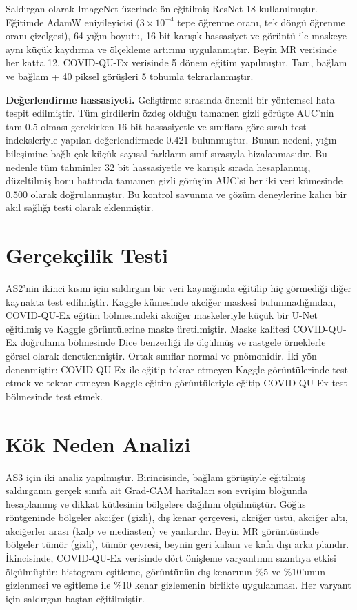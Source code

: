 Saldırgan olarak ImageNet \cite{deng2009imagenet} üzerinde ön eğitilmiş ResNet-18 \cite{he2016resnet} kullanılmıştır. Eğitimde AdamW eniyileyicisi \cite{loshchilov2019adamw} ($3 \times 10^{-4}$ tepe öğrenme oranı, tek döngü öğrenme oranı çizelgesi), 64 yığın boyutu, 16 bit karışık hassasiyet ve görüntü ile maskeye aynı küçük kaydırma ve ölçekleme artırımı uygulanmıştır. Beyin MR verisinde her katta 12, COVID-QU-Ex verisinde 5 dönem eğitim yapılmıştır. Tam, bağlam ve bağlam + 40 piksel görüşleri 5 tohumla tekrarlanmıştır.

\textbf{Değerlendirme hassasiyeti.} Geliştirme sırasında önemli bir yöntemsel hata tespit edilmiştir. Tüm girdilerin özdeş olduğu tamamen gizli görüşte AUC'nin tam $0.5$ olması gerekirken 16 bit hassasiyetle ve sınıflara göre sıralı test indeksleriyle yapılan değerlendirmede $0.421$ bulunmuştur. Bunun nedeni, yığın bileşimine bağlı çok küçük sayısal farkların sınıf sırasıyla hizalanmasıdır. Bu nedenle tüm tahminler 32 bit hassasiyetle ve karışık sırada hesaplanmış, düzeltilmiş boru hattında tamamen gizli görüşün AUC'si her iki veri kümesinde $0.500$ olarak doğrulanmıştır. Bu kontrol savunma ve çözüm deneylerine kalıcı bir akıl sağlığı testi olarak eklenmiştir.

\section{Gerçekçilik Testi}\label{sec:transfer}

AS2'nin ikinci kısmı için saldırgan bir veri kaynağında eğitilip hiç görmediği diğer kaynakta test edilmiştir. Kaggle kümesinde akciğer maskesi bulunmadığından, COVID-QU-Ex eğitim bölmesindeki akciğer maskeleriyle küçük bir U-Net \cite{ronneberger2015unet} eğitilmiş ve Kaggle görüntülerine maske üretilmiştir. Maske kalitesi COVID-QU-Ex doğrulama bölmesinde Dice benzerliği ile ölçülmüş ve rastgele örneklerle görsel olarak denetlenmiştir. Ortak sınıflar normal ve pnömonidir. İki yön denenmiştir: COVID-QU-Ex ile eğitip tekrar etmeyen Kaggle görüntülerinde test etmek ve tekrar etmeyen Kaggle eğitim görüntüleriyle eğitip COVID-QU-Ex test bölmesinde test etmek.

\section{Kök Neden Analizi}\label{sec:rootcause}

AS3 için iki analiz yapılmıştır. Birincisinde, bağlam görüşüyle eğitilmiş saldırganın gerçek sınıfa ait Grad-CAM \cite{selvaraju2017gradcam} haritaları son evrişim bloğunda hesaplanmış ve dikkat kütlesinin bölgelere dağılımı ölçülmüştür. Göğüs röntgeninde bölgeler akciğer (gizli), dış kenar çerçevesi, akciğer üstü, akciğer altı, akciğerler arası (kalp ve mediasten) ve yanlardır. Beyin MR görüntüsünde bölgeler tümör (gizli), tümör çevresi, beynin geri kalanı ve kafa dışı arka plandır. İkincisinde, COVID-QU-Ex verisinde dört önişleme varyantının sızıntıya etkisi ölçülmüştür: histogram eşitleme, görüntünün dış kenarının \%5 ve \%10'unun gizlenmesi ve eşitleme ile \%10 kenar gizlemenin birlikte uygulanması. Her varyant için saldırgan baştan eğitilmiştir.

